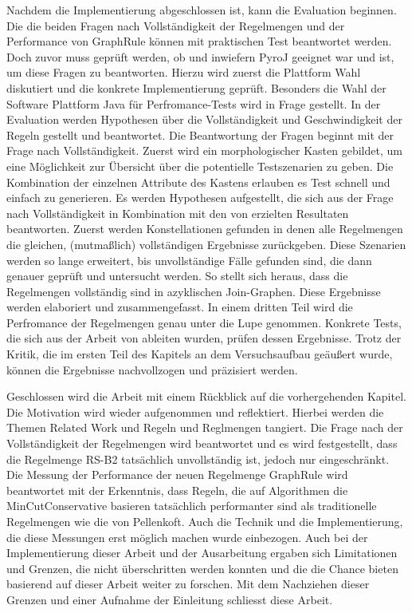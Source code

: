 Nachdem die Implementierung abgeschlossen ist, kann die Evaluation beginnen. Die die beiden Fragen nach Vollständigkeit der Regelmengen und der Performance von GraphRule können mit praktischen Test beantwortet werden. Doch zuvor muss geprüft werden, ob und inwiefern PyroJ geeignet war und ist, um diese Fragen zu beantworten. Hierzu wird zuerst die Plattform Wahl diskutiert und die konkrete Implementierung geprüft. Besonders die Wahl der Software Plattform Java für Perfromance-Tests wird in Frage gestellt. In der Evaluation werden Hypothesen über die Vollständigkeit und Geschwindigkeit der Regeln gestellt und beantwortet. Die Beantwortung der Fragen beginnt mit der Frage nach Vollständigkeit. Zuerst wird ein morphologischer Kasten gebildet, um eine Möglichkeit zur Übersicht über die potentielle Testszenarien zu geben. Die Kombination der einzelnen Attribute des Kastens erlauben es Test schnell und einfach zu generieren. Es werden Hypothesen aufgestellt, die sich aus der Frage nach Vollständigkeit in Kombination mit den von \cite{shanbhag2014optimizing} erzielten Resultaten  beantworten. Zuerst werden Konstellationen gefunden in denen alle Regelmengen die gleichen, (mutmaßlich) vollständigen Ergebnisse zurückgeben. Diese Szenarien werden so lange erweitert, bis unvollständige Fälle gefunden sind, die dann genauer geprüft und untersucht werden. So stellt sich heraus, dass die Regelmengen vollständig sind in azyklischen Join-Graphen. Diese Ergebnisse werden elaboriert und zusammengefasst. In einem dritten Teil wird die Perfromance der Regelmengen genau unter die Lupe genommen. Konkrete Tests, die sich aus der Arbeit von \cite{shanbhag2014optimizing} ableiten wurden, prüfen dessen Ergebnisse. Trotz der Kritik, die im ersten Teil des Kapitels an dem Versuchsaufbau geäußert wurde, können die Ergebnisse nachvollzogen und präzisiert werden.

Geschlossen wird die Arbeit mit einem Rückblick auf die vorhergehenden Kapitel. Die Motivation wird wieder aufgenommen und reflektiert. Hierbei werden die Themen Related Work und Regeln und Reglmengen tangiert. Die Frage nach der Vollständigkeit der Regelmengen wird beantwortet und es wird festgestellt, dass die Regelmenge RS-B2 tatsächlich unvollständig ist, jedoch nur eingeschränkt. Die Messung der Performance der neuen Regelmenge GraphRule wird beantwortet mit der Erkenntnis, dass Regeln, die auf Algorithmen die MinCutConservative basieren tatsächlich performanter sind als traditionelle Regelmengen wie die von Pellenkoft. Auch die Technik und die Implementierung, die diese Messungen erst möglich machen wurde einbezogen. Auch bei der Implementierung dieser Arbeit und der Ausarbeitung ergaben sich Limitationen und Grenzen, die nicht überschritten werden konnten und die die Chance bieten basierend auf dieser Arbeit weiter zu forschen. Mit dem Nachziehen dieser Grenzen und einer Aufnahme der Einleitung schliesst diese Arbeit.